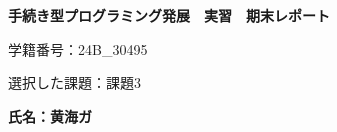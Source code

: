 \documentclass[a4j,11pt]{jarticle}
\begin{document}
\begin{center}
\vspace{10mm}

{\bf {\huge 手続き型プログラミング発展　実習　期末レポート}}

\vspace{80mm}

学籍番号：24B\_{}30495

\vspace{10mm}

選択した課題：課題3

\vspace{20mm}

{\bf {\LARGE 氏名：黄海ガ}}
\end{center}

\newpage


\newpage


\newpage


\newpage


\newpage


\newpage







\end{document}
